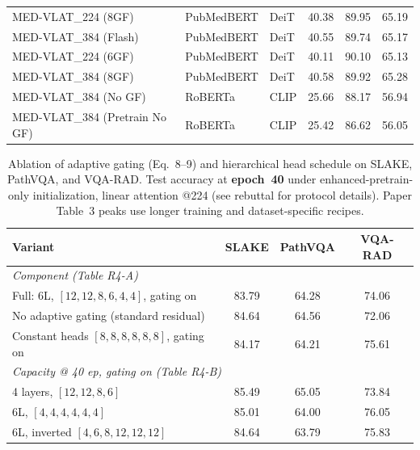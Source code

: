 \begin{table}[t]
{\begin{tabular}{l l l c c c}
MED-VLAT\_224 (8GF)
& PubMedBERT & DeiT
& 40.38
& 89.95
& 65.19 \\

MED-VLAT\_384 (Flash)
& PubMedBERT & DeiT
& 40.55
& 89.74
& 65.17 \\

MED-VLAT\_224 (6GF)
& PubMedBERT & DeiT
& 40.11
& 90.10
& 65.13 \\

MED-VLAT\_384 (8GF)
& PubMedBERT & DeiT
& 40.58
& 89.92
& 65.28 \\

MED-VLAT\_384 (No GF)
& RoBERTa & CLIP
& 25.66
& 88.17
& 56.94 \\

MED-VLAT\_384 (Pretrain No GF)
& RoBERTa & CLIP
& 25.42
& 86.62
& 56.05 \\

\bottomrule
\end{tabular}}
\end{table}


\begin{table}[t]
\centering
\caption{Ablation of adaptive gating (Eq.~8--9) and hierarchical head schedule
on SLAKE, PathVQA, and VQA-RAD. Test accuracy at \textbf{epoch~40} under
enhanced-pretrain-only initialization, linear attention @224 (see rebuttal
for protocol details). Paper Table~3 peaks use longer training and
dataset-specific recipes.}
\label{tab:gating_head_ablation_40ep}
\small
\begin{tabular}{lccc}
\toprule
\textbf{Variant} & \textbf{SLAKE} & \textbf{PathVQA} & \textbf{VQA-RAD} \\
\midrule
\multicolumn{4}{l}{\textit{Component (Table R4-A)}} \\
Full: 6L, $[12,12,8,6,4,4]$, gating on
  & 83.79 & 64.28 & 74.06 \\
No adaptive gating (standard residual)
  & 84.64 & 64.56 & 72.06 \\
Constant heads $[8,8,8,8,8,8]$, gating on
  & 84.17 & 64.21 & 75.61 \\
\midrule
\multicolumn{4}{l}{\textit{Capacity @ 40 ep, gating on (Table R4-B)}} \\
4 layers, $[12,12,8,6]$
  & 85.49 & 65.05 & 73.84 \\
6L, $[4,4,4,4,4,4]$
  & 85.01 & 64.00 & 76.05 \\
6L, inverted $[4,6,8,12,12,12]$
  & 84.64 & 63.79 & 75.83 \\
\bottomrule
\end{tabular}
\end{table}


